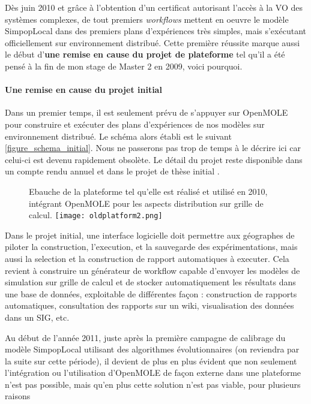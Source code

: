 
Dès juin 2010 et grâce à l'obtention d'un certificat autorisant l'accès à la VO des systèmes complexes, de tout premiers \textit{workflows} mettent en oeuvre le modèle SimpopLocal dans des premiers plans d'expériences très simples, mais s'exécutant officiellement sur environnement distribué. Cette première réussite marque aussi le début d'\textbf{une remise en cause du projet de plateforme} tel qu'il a été pensé à la fin de mon stage de Master 2 en 2009, voici pourquoi.

\paragraph {Une remise en cause du projet initial}

Dans un premier temps, il est seulement prévu de s'appuyer sur OpenMOLE pour construire et exécuter des plans d'expériences de nos modèles sur environnement distribué. Le schéma alors établi est le suivant \ref{figure_schema_initial}. Nous ne passerons pas trop de temps à le décrire ici car celui-ci est devenu rapidement obsolète. Le détail du projet reste disponible dans un compte rendu annuel et dans le projet de thèse initial \autocites{Rey2010, Rey2009}.

\begin{figure}[!htbp]
	\begin{sidecaption}[fortoc]{Ebauche de la plateforme tel qu'elle est réalisé et utilisé en 2010, intégrant OpenMOLE pour les aspects distribution sur grille de calcul.}
	 \centering
	 	\texttt{[image: oldplatform2.png]}
 \end{sidecaption}
\end{figure}

Dans le projet initial, une interface logicielle doit permettre aux géographes de piloter la construction, l'execution, et la sauvegarde des expérimentations, mais aussi la selection et la construction de rapport automatiques à executer. Cela revient à construire un générateur de workflow capable d'envoyer les modèles de simulation sur grille de calcul et de stocker automatiquement les résultats dans une base de données, exploitable de différentes façon : construction de rapports automatiques, consultation des rapports sur un wiki, visualisation des données dans un SIG, etc.

Au début de l'année 2011, juste après la première campagne de calibrage du modèle SimpopLocal utilisant des algorithmes évolutionnaires (on reviendra par la suite sur cette période), il devient de plus en plus évident que non seulement l'intégration ou l'utilisation d'OpenMOLE de façon externe dans une plateforme n'est pas possible, mais qu'en plus cette solution n'est pas viable, pour plusieurs raisons

